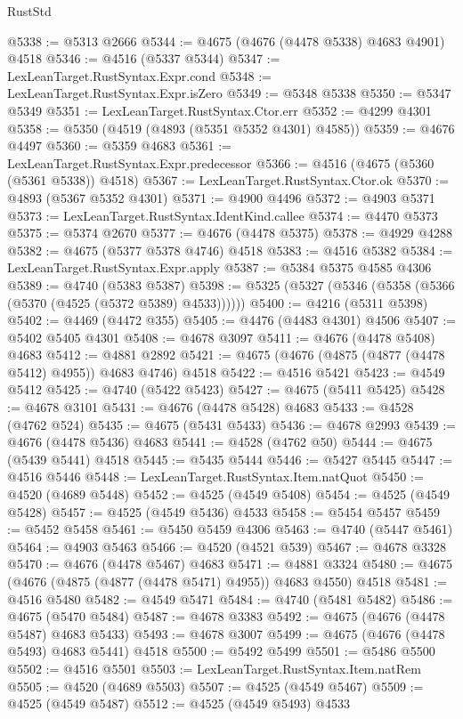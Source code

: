\begin{lexlean}{RustStd}
\begin{coremodule}
@5338 := @5313 @2666
@5344 := @4675 (@4676 (@4478 @5338) @4683 @4901) @4518
@5346 := @4516 (@5337 @5344)
@5347 := LexLeanTarget.RustSyntax.Expr.cond
@5348 := LexLeanTarget.RustSyntax.Expr.isZero
@5349 := @5348 @5338
@5350 := @5347 @5349
@5351 := LexLeanTarget.RustSyntax.Ctor.err
@5352 := @4299 @4301
@5358 := @5350 (@4519 (@4893 (@5351 @5352 @4301) @4585))
@5359 := @4676 @4497
@5360 := @5359 @4683
@5361 := LexLeanTarget.RustSyntax.Expr.predecessor
@5366 := @4516 (@4675 (@5360 (@5361 @5338)) @4518)
@5367 := LexLeanTarget.RustSyntax.Ctor.ok
@5370 := @4893 (@5367 @5352 @4301)
@5371 := @4900 @4496
@5372 := @4903 @5371
@5373 := LexLeanTarget.RustSyntax.IdentKind.callee
@5374 := @4470 @5373
@5375 := @5374 @2670
@5377 := @4676 (@4478 @5375)
@5378 := @4929 @4288
@5382 := @4675 (@5377 @5378 @4746) @4518
@5383 := @4516 @5382
@5384 := LexLeanTarget.RustSyntax.Expr.apply
@5387 := @5384 @5375 @4585 @4306
@5389 := @4740 (@5383 @5387)
@5398 := @5325 (@5327 (@5346 (@5358 (@5366 (@5370 (@4525 (@5372 @5389) @4533))))))
@5400 := @4216 (@5311 @5398)
@5402 := @4469 (@4472 @355)
@5405 := @4476 (@4483 @4301) @4506
@5407 := @5402 @5405 @4301
@5408 := @4678 @3097
@5411 := @4676 (@4478 @5408) @4683
@5412 := @4881 @2892
@5421 := @4675 (@4676 (@4875 (@4877 (@4478 @5412) @4955)) @4683 @4746) @4518
@5422 := @4516 @5421
@5423 := @4549 @5412
@5425 := @4740 (@5422 @5423)
@5427 := @4675 (@5411 @5425)
@5428 := @4678 @3101
@5431 := @4676 (@4478 @5428) @4683
@5433 := @4528 (@4762 @524)
@5435 := @4675 (@5431 @5433)
@5436 := @4678 @2993
@5439 := @4676 (@4478 @5436) @4683
@5441 := @4528 (@4762 @50)
@5444 := @4675 (@5439 @5441) @4518
@5445 := @5435 @5444
@5446 := @5427 @5445
@5447 := @4516 @5446
@5448 := LexLeanTarget.RustSyntax.Item.natQuot
@5450 := @4520 (@4689 @5448)
@5452 := @4525 (@4549 @5408)
@5454 := @4525 (@4549 @5428)
@5457 := @4525 (@4549 @5436) @4533
@5458 := @5454 @5457
@5459 := @5452 @5458
@5461 := @5450 @5459 @4306
@5463 := @4740 (@5447 @5461)
@5464 := @4903 @5463
@5466 := @4520 (@4521 @539)
@5467 := @4678 @3328
@5470 := @4676 (@4478 @5467) @4683
@5471 := @4881 @3324
@5480 := @4675 (@4676 (@4875 (@4877 (@4478 @5471) @4955)) @4683 @4550) @4518
@5481 := @4516 @5480
@5482 := @4549 @5471
@5484 := @4740 (@5481 @5482)
@5486 := @4675 (@5470 @5484)
@5487 := @4678 @3383
@5492 := @4675 (@4676 (@4478 @5487) @4683 @5433)
@5493 := @4678 @3007
@5499 := @4675 (@4676 (@4478 @5493) @4683 @5441) @4518
@5500 := @5492 @5499
@5501 := @5486 @5500
@5502 := @4516 @5501
@5503 := LexLeanTarget.RustSyntax.Item.natRem
@5505 := @4520 (@4689 @5503)
@5507 := @4525 (@4549 @5467)
@5509 := @4525 (@4549 @5487)
@5512 := @4525 (@4549 @5493) @4533

\end{coremodule}
\end{lexlean}
